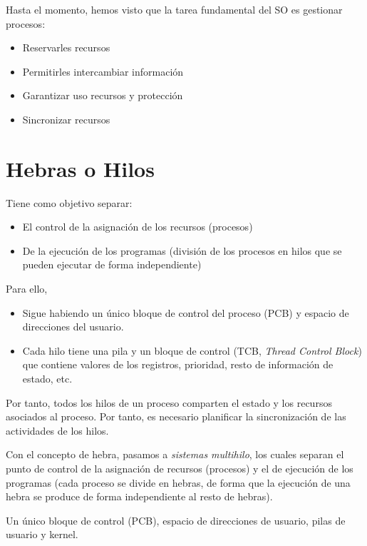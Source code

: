 Hasta el momento, hemos visto que la tarea fundamental del SO es gestionar procesos:
\begin{itemize}
    \item Reservarles recursos
    \item Permitirles intercambiar información
    \item Garantizar uso recursos y protección
    \item Sincronizar recursos
\end{itemize}

\section{Hebras o Hilos}
\begin{definicion}[Hebra]
    Tiene como objetivo separar:
    \begin{itemize}
        \item El control de la asignación de los recursos (procesos)

        \item De la ejecución de los programas (división de los procesos en hilos que se pueden ejecutar de forma independiente)       
    \end{itemize}

    Para ello,
    \begin{itemize}
        \item Sigue habiendo un único bloque de control del proceso (PCB) y espacio de direcciones del usuario.

        \item Cada hilo tiene una pila y un bloque de control (TCB, \textit{Thread Control Block})  que contiene valores de los registros, prioridad, resto de información de estado, etc.
    \end{itemize}

    Por tanto, todos los hilos de un proceso comparten el estado y los recursos asociados al proceso. Por tanto, es necesario planificar la sincronización de las actividades de los hilos.
\end{definicion}

Con el concepto de hebra, pasamos a \emph{sistemas multihilo}, los cuales separan el punto de control de la asignación de recursos (procesos) y el de ejecución de los programas (cada proceso se divide en hebras, de forma que la ejecución de una hebra se produce de forma independiente al resto de hebras).

\begin{definicion} 
    Un único bloque de control (PCB), espacio de direcciones de usuario, pilas de usuario y kernel.
\end{definicion}

